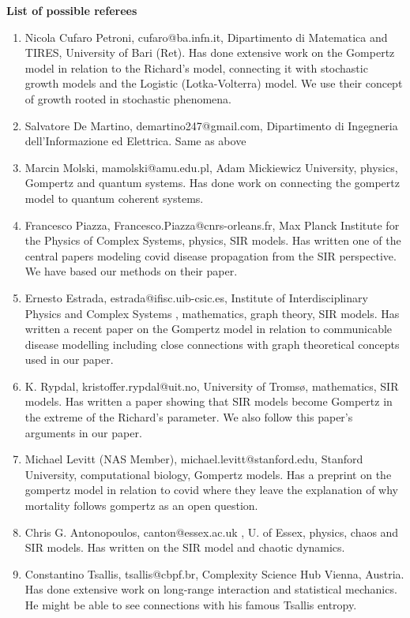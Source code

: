 \documentclass[11pt,a4paper,roman]{moderncv}
\begin{document}
\textbf{List of possible referees}
\begin{enumerate}

\item Nicola Cufaro Petroni, cufaro@ba.infn.it,
Dipartimento di Matematica and TIRES, University of Bari (Ret).
Has done extensive work on the Gompertz model in relation to the Richard's model, connecting it with stochastic growth models and the Logistic (Lotka-Volterra) model. We use their concept of growth rooted in stochastic phenomena.
\item Salvatore De Martino,
demartino247@gmail.com, 
Dipartimento di Ingegneria dell’Informazione ed Elettrica.
Same as above
\item Marcin Molski, mamolski@amu.edu.pl, Adam Mickiewicz University, physics, Gompertz and quantum systems. Has done work on connecting the gompertz model to quantum coherent systems.
\item Francesco Piazza, Francesco.Piazza@cnrs-orleans.fr, Max Planck Institute for the Physics of Complex Systems, physics, SIR models.
Has written one of the central papers modeling covid disease propagation from the SIR perspective. We have based our methods on their paper.
\item Ernesto Estrada, estrada@ifisc.uib-csic.es, Institute of Interdisciplinary Physics and Complex Systems , mathematics, graph theory, SIR models.
Has written a recent paper on the Gompertz model in relation to communicable disease modelling including close connections with graph theoretical concepts used in our paper. 
\item K. Rypdal, kristoffer.rypdal@uit.no, University of Tromsø, mathematics, SIR models.
Has written a paper showing that SIR models become Gompertz in the extreme of the Richard's parameter. We also follow this paper's arguments in our paper.
\item Michael Levitt (NAS Member), michael.levitt@stanford.edu, Stanford University, computational biology, Gompertz models.
Has a preprint on the gompertz model in relation to covid where they leave the explanation of why mortality follows gompertz as an open question.
\item Chris G. Antonopoulos, canton@essex.ac.uk , U. of Essex, physics, chaos and SIR models.
Has written on the SIR model and chaotic dynamics.
\item Constantino Tsallis, tsallis@cbpf.br, Complexity Science Hub Vienna, Austria. Has done extensive work on long-range interaction and statistical mechanics. He might be able to see connections with his famous Tsallis entropy.


\end{enumerate} 
\end{document}
